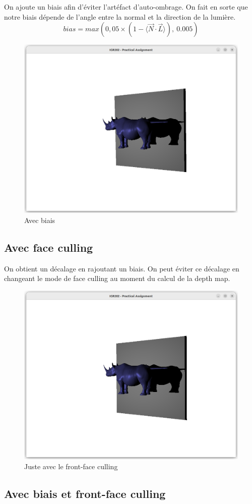 \documentclass{article}
\begin{document}
On ajoute un biais afin d'éviter l'artéfact d'auto-ombrage.
On fait en sorte que notre biais dépende de l'angle entre la normal et la direction de la lumière.
\[
    bias = max(0,05 \times (1 - \langle \Vec{N} \cdot \Vec{L} \rangle),\ 0.005) 
\]

\begin{figure}[h]
    \centering
    \includegraphics[width=0.5\linewidth]{images/bias.png}
    \caption{Avec biais}
    \label{fig:bias}
\end{figure}

\subsection{Avec face culling}

On obtient un décalage en rajoutant un biais. On peut éviter ce décalage en changeant le mode de face culling au moment du calcul de la depth map.

\begin{figure}[h]
    \centering
    \includegraphics[width=0.5\linewidth]{images/cullFace.png}
    \caption{Juste avec le front-face culling}
    \label{fig:cullFace}
\end{figure}

\newpage

\subsection{Avec biais et front-face culling}
\end{document}
